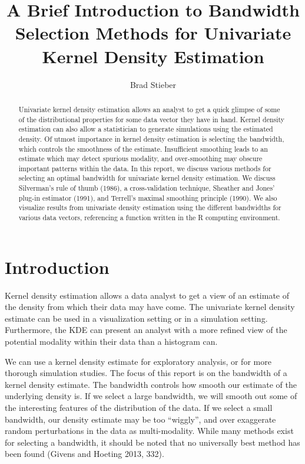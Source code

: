 \documentclass[]{article}
\title{A Brief Introduction to Bandwidth Selection Methods for Univariate
Kernel Density Estimation}
\author{Brad Stieber}
\date{}
\begin{document}
\maketitle
\begin{abstract}
Univariate kernel density estimation allows an analyst to get a quick
glimpse of some of the distributional properties for some data vector
they have in hand. Kernel density estimation can also allow a
statistician to generate simulations using the estimated density. Of
utmost importance in kernel density estimation is selecting the
bandwidth, which controls the smoothness of the estimate. Insufficient
smoothing leads to an estimate which may detect spurious modality, and
over-smoothing may obscure important patterns within the data. In this
report, we discuss various methods for selecting an optimal bandwidth
for univariate kernel density estimation. We discuss Silverman's rule of
thumb (1986), a cross-validation technique, Sheather and Jones' plug-in
estimator (1991), and Terrell's maximal smoothing principle (1990). We
also visualize results from univariate density estimation using the
different bandwidths for various data vectors, referencing a function
written in the R computing environment.
\end{abstract}

\section{Introduction}\label{introduction}

Kernel density estimation allows a data analyst to get a view of an
estimate of the density from which their data may have come. The
univariate kernel density estimate can be used in a visualization
setting or in a simulation setting. Furthermore, the KDE can present an
analyst with a more refined view of the potential modality within their
data than a histogram can.

We can use a kernel density estimate for exploratory analysis, or for
more thorough simulation studies. The focus of this report is on the
bandwidth of a kernel density estimate. The bandwidth controls how
smooth our estimate of the underlying density is. If we select a large
bandwidth, we will smooth out some of the interesting features of the
distribution of the data. If we select a small bandwidth, our density
estimate may be too ``wiggly'', and over exaggerate random perturbations
in the data as multi-modality. While many methods exist for selecting a
bandwidth, it should be noted that no universally best method has been
found (Givens and Hoeting 2013, 332).
\end{document}
